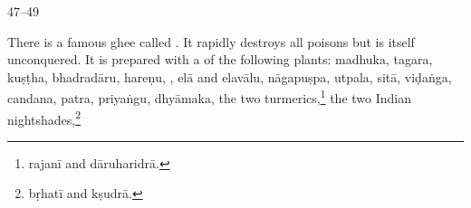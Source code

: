   \begin{translation}
    
    \item[ 47--49]
    
    \label{ajeya} There is a famous ghee called . It
rapidly destroys all poisons but is itself unconquered. It is prepared with a
 of the following plants: %
\gls{madhuka},
\gls{tagara},
\gls{kuṣṭha},
\gls{bhadradāru},
\gls{hareṇu},
,
%
\gls{elā}
and \gls{elavālu},
%
\gls{nāgapuṣpa},
\gls{utpala},
\gls{sitā},
\gls{viḍaṅga},
\gls{candana},
\gls{patra},
\gls{priyaṅgu},
\gls{dhyāmaka},
the two turmerics,\footnote{\gls{rajanī} and \gls{dāruharidrā}.}
%
the two Indian nightshades,\footnote{\gls{bṛhatī} and \gls{kṣudrā}.}

\end{translation}

